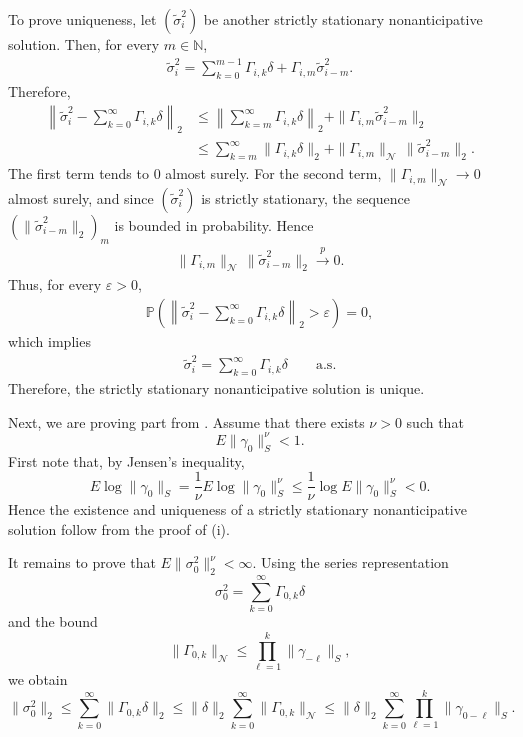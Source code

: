 \documentclass[12pt,a4paper]{article}
\theoremstyle{definition}
\begin{document}
To prove uniqueness, let \((\tilde{\sigma}_i^2)\) be another strictly stationary nonanticipative solution. Then, for every \(m\in\mathbb N\),
\begin{gather}
    \tilde{\sigma}_i^2
    =
    \sum_{k=0}^{m-1}\Gamma_{i,k}\delta+\Gamma_{i,m}\tilde{\sigma}_{i-m}^2.
\end{gather}
Therefore,
\begin{align*}
    \left\|
        \tilde{\sigma}_i^2-\sum_{k=0}^\infty \Gamma_{i,k}\delta
    \right\|_2
    &\le
    \left\|
        \sum_{k=m}^\infty \Gamma_{i,k}\delta
    \right\|_2
    +
    \|\Gamma_{i,m}\tilde{\sigma}_{i-m}^2\|_2 \\
    &\le
    \sum_{k=m}^\infty \|\Gamma_{i,k}\delta\|_2
    +
    \|\Gamma_{i,m}\|_{\mathcal N}\,\|\tilde{\sigma}_{i-m}^2\|_2 .
\end{align*}
The first term tends to \(0\) almost surely. For the second term, \(\|\Gamma_{i,m}\|_{\mathcal N}\to 0\) almost surely, and since \((\tilde{\sigma}_i^2)\) is strictly stationary, the sequence \((\|\tilde{\sigma}_{i-m}^2\|_2)_m\) is bounded in probability. Hence
\begin{gather}
    \|\Gamma_{i,m}\|_{\mathcal N}\,\|\tilde{\sigma}_{i-m}^2\|_2 \xrightarrow{p} 0.
\end{gather}
Thus, for every \(\varepsilon>0\),
\begin{gather}
    \mathbb P\left(
        \left\|
            \tilde{\sigma}_i^2-\sum_{k=0}^\infty \Gamma_{i,k}\delta
        \right\|_2
        >\varepsilon
    \right)=0,
\end{gather}
which implies
\begin{gather}
    \tilde{\sigma}_i^2
    =
    \sum_{k=0}^\infty \Gamma_{i,k}\delta
    \qquad\text{a.s.}
\end{gather}
Therefore, the strictly stationary nonanticipative solution is unique.

Next, we are proving part  from . 
Assume that there exists \(\nu>0\) such that
\[
E\|\gamma_0\|_S^\nu<1.
\]
First note that, by Jensen's inequality,
\[
E\log \|\gamma_0\|_S
=
\frac{1}{\nu}E\log \|\gamma_0\|_S^\nu
\le
\frac{1}{\nu}\log E\|\gamma_0\|_S^\nu
<0.
\]
Hence the existence and uniqueness of a strictly stationary nonanticipative solution follow from the proof of (i).

It remains to prove that \(E\|\sigma_0^2\|_2^\nu<\infty\). Using the series representation
\[
\sigma_0^2=\sum_{k=0}^\infty \Gamma_{0,k}\delta
\]
and the bound
\[
\|\Gamma_{0,k}\|_{\mathcal N}\le \prod_{\ell=1}^k \|\gamma_{-\ell}\|_S,
\]
we obtain
\[
\|\sigma_0^2\|_2
\le
\sum_{k=0}^\infty \|\Gamma_{0,k}\delta\|_2
\le
\|\delta\|_2\sum_{k=0}^\infty \|\Gamma_{0,k}\|_{\mathcal N}
\le
\|\delta\|_2\sum_{k=0}^\infty \prod_{\ell=1}^k \|\gamma_{0-\ell}\|_S.
\]
\end{document}
